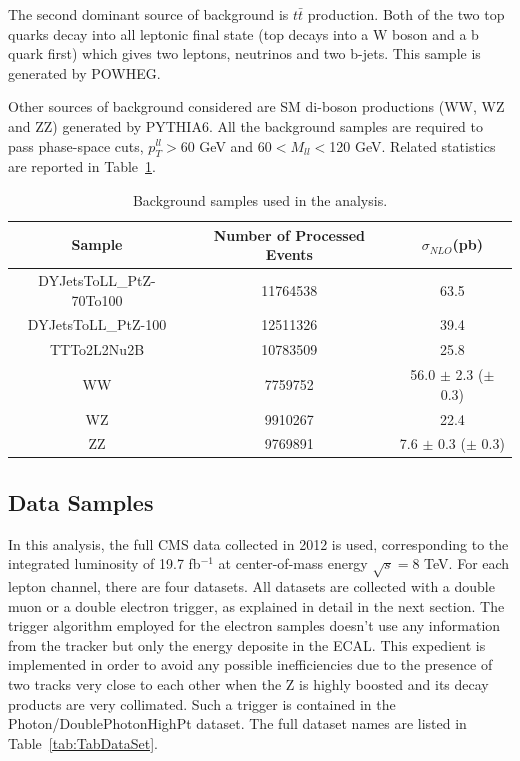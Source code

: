 The second dominant source of background is $t\bar{t}$ production. Both of the two top quarks decay into all leptonic final state (top decays into a W boson and a b quark first) which gives two leptons, neutrinos and two b-jets. This sample is generated by POWHEG\cite{POWHEG}.

Other sources of background considered are SM di-boson productions (WW, WZ and ZZ) generated by PYTHIA6. All the background samples are required to pass phase-space cuts, $p_{T}^{ll} > $60 GeV and 60$ < M_{ll} < $120 GeV. Related statistics are reported in Table~\ref{tab:TabBkgMC}.

\begin{center}
  \begin{table}[h]
    \begin{center}
      \begin{tabular}{|c|c|c|}
        \hline
        Sample & Number of Processed Events & $\sigma_{NLO}$(pb) \\ \hline
        DYJetsToLL\_PtZ-70To100 & 11764538 & 63.5 \\ \hline
        DYJetsToLL\_PtZ-100 & 12511326 & 39.4 \\ \hline
        TTTo2L2Nu2B & 10783509 & 25.8 \\ \hline
        WW & 7759752 & 56.0 $\pm$ 2.3 ($\pm$ 0.3) \\ \hline
        WZ & 9910267 & 22.4 \\ \hline
        ZZ & 9769891 & 7.6 $\pm$ 0.3 ($\pm$ 0.3)\\
        \hline
      \end{tabular}
    \end{center}
    \caption{\label{tab:TabBkgMC}Background samples used in the analysis.}    
  \end{table}
\end{center}

\subsection{Data Samples}
In this analysis, the full CMS data collected in 2012 is used, corresponding to the integrated luminosity of 19.7 fb$^{-1}$ at center-of-mass energy $\sqrt{s} = $8 TeV. For each lepton channel, there are four datasets. All datasets are collected with a double muon or a double electron trigger, as explained in detail in the next section. The trigger algorithm employed for the electron samples doesn't use any information from the tracker but only the energy deposite in the ECAL. This expedient is implemented in order to avoid any possible inefficiencies due to the presence of two tracks very close to each other when the Z is highly boosted and its decay products are very collimated. Such a trigger is contained in the Photon/DoublePhotonHighPt dataset. The full dataset names are listed in Table~\ref{tab:TabDataSet}.

